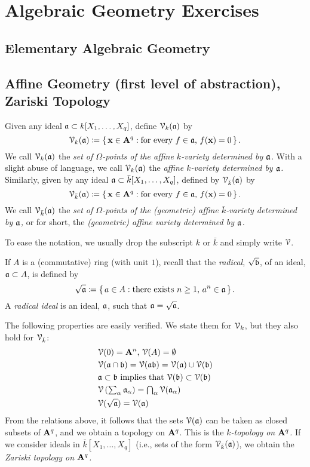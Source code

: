 \chapter{Algebraic Geometry Exercises}
\section{Elementary Algebraic Geometry}
\section{Affine Geometry (first level of abstraction), Zariski Topology}
\begin{definition}
Given any ideal $\mathfrak{a}\subset k[X_1,\dotsc,X_q]$, define $\mathcal{V}_k(\mathfrak{a})$
by
\[
\mathcal{V}_k(\mathfrak{a})\coloneqq\left\{\,\mathbf{x}\in\mathbf{A}^q:\text{for every
$f\in\mathfrak{a}$, $f(\mathbf{x})=0$}\,\right\}.
\]
We call $\mathcal{V}_k(\mathfrak{a})$ the \emph{set of $\Omega$-points of the affine
  $k$-variety determined by $\mathfrak{a}$.} With a slight abuse of language, we
call $\mathcal{V}_k(\mathfrak{a})$ the \emph{affine $k$-variety determined by $\mathfrak{a}$.}
Similarly, given by any ideal $\mathfrak{a}\subset\bar k[X_1,\dotsc,X_q]$,
defined by $\mathcal{V}_{\bar k}(\mathfrak{a})$ by
\[
\mathcal{V}_{\bar k}(\mathfrak{a})\coloneqq\left\{\,\mathbf{x}\in \mathbf{A}^q:
\text{for every $f\in\mathfrak{a}$, $f(\mathbf{x})=0$}\,\right\}.
\]
We call $\mathcal{V}_{\bar k}(\mathfrak{a})$ the \emph{set of $\Omega$-points of the
  (geometric) affine $\bar k$-variety determined by $\mathfrak{a}$,} or for
short, the \emph{(geometric) affine variety determined by $\mathfrak{a}$.}
\end{definition}

To ease the notation, we usually drop the subscript $k$ or $\bar k$ and
simply write $\mathcal{V}$.

If $A$ is a (commutative) ring (with unit $1$), recall that the
\emph{radical}, $\sqrt{\mathfrak{b}}$, of an ideal, $\mathfrak{a}\subset A$, is defined
by
\[
\sqrt{\mathfrak{a}}\coloneqq\left\{\,a\in A:\text{there exists $n\geq 1$,
    $a^n\in\mathfrak{a}$}\,\right\}.
\]
A \emph{radical ideal} is an ideal, $\mathfrak{a}$, such that
$\mathfrak{a}=\sqrt{\mathfrak{a}}$.

The following properties are easily verified. We state them for $\mathcal{V}_k$, but
they also hold for $\mathcal{V}_{\bar k}$:
\begin{align*}
&\text{$\mathcal{V}(0)=\mathbf{A}^n$, $\mathcal{V}(A)=\emptyset$}\\
&\mathcal{V}(\mathfrak{a}\cap\mathfrak{b})=\mathcal{V}(\mathfrak{a}\mathfrak{b})=\mathcal{V}(\mathfrak{a})\cup\mathcal{V}(\mathfrak{b})\\
&\text{$\mathfrak{a}\subset\mathfrak{b}$ implies that $\mathcal{V}(\mathfrak{b})\subset\mathcal{V}(\mathfrak{b})$}\\
&\mathcal{V}\left({\textstyle\sum_\alpha\mathfrak{a}_\alpha}\right)
={\textstyle \bigcap_\alpha\mathcal{V}(\mathfrak{a}_\alpha)}\\
&\mathcal{V}(\sqrt{\mathfrak{a}})=\mathcal{V}(\mathfrak{a})
\end{align*}
From the relations above, it follows that the sets $\mathcal{V}(\mathfrak{a})$ can be taken
as closed subsets of $\mathbf{A}^q$, and we obtain a topology on $\mathbf{A}^q$. This
is the \emph{$k$-topology on $\mathbf{A}^q$.} If we consider ideals in $\bar
k[X_1,\dotsc,X_q]$ (i.e., sets of the form $\mathcal{V}_{\bar k}(\mathfrak{a})$), we obtain
the \emph{Zariski topology on $\mathbf{A}^q$.}

